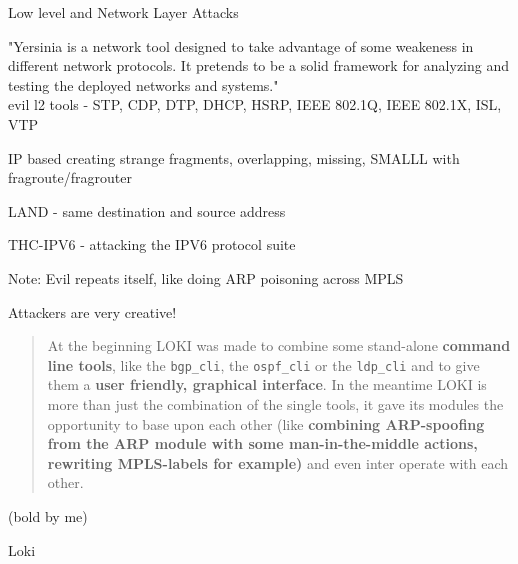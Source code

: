 \documentclass[Screen16to9,17pt]{foils}
\begin{document}

\begin{list1}
\item Low level and Network Layer Attacks
\begin{list2}
\item "Yersinia is a network tool designed to take advantage of some weakeness in different network protocols. It pretends to be a solid framework for analyzing and testing the deployed networks and systems."\\
evil l2 tools - STP, CDP, DTP, DHCP, HSRP, IEEE 802.1Q, IEEE 802.1X, ISL, VTP\\
\item IP based creating strange fragments, overlapping, missing, SMALLL with fragroute/fragrouter
\item LAND - same destination and source address
\item THC-IPV6 - attacking the IPV6 protocol suite
\end{list2}
\item Note: Evil repeats itself, like doing ARP poisoning across MPLS
\end{list1}

\vskip 1cm
\centerline{\Large Attackers are very creative!}


\begin{quote}
At the beginning LOKI was made to combine some stand-alone {\bf command line tools}, like the \verb+bgp_cli+, the \verb+ospf_cli+ or the \verb+ldp_cli+ and to give them a {\bf user friendly, graphical interface}. In the meantime LOKI is more than just the combination of the single tools, it gave its modules the opportunity to base upon each other (like {\bf combining ARP-spoofing from the ARP module with some man-in-the-middle actions, rewriting MPLS-labels for example)} and even inter operate with each other.
\end{quote}
(bold by me)

\begin{list1}
\item {} Loki
\item {}

\end{list1}
\end{document}
